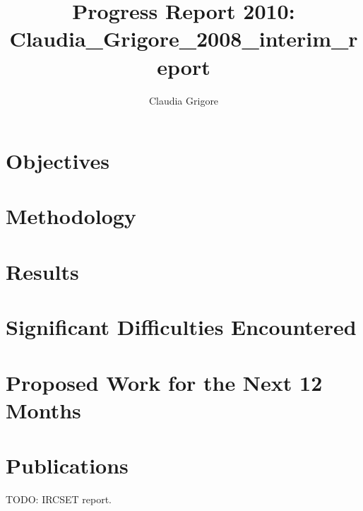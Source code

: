 \documentclass{article}
\title{Progress Report 2010: Claudia\_Grigore\_2008\_interim\_report}
\author{Claudia Grigore}
\begin{document}
\maketitle

\section{Objectives}

\section{Methodology}

\section{Results}

\section{Significant Difficulties Encountered}

\section{Proposed Work for the Next 12 Months}

\section{Publications}

TODO: IRCSET report.
\end{document}
